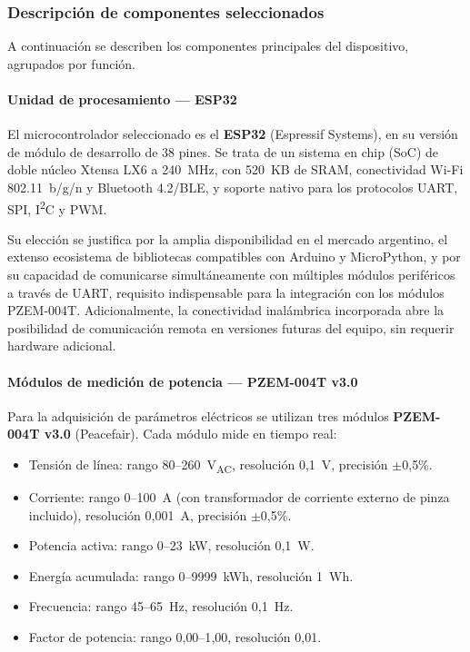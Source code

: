\subsubsection{Descripción de componentes seleccionados}
\label{subsubsec:componentes}

A continuación se describen los componentes principales del dispositivo,
agrupados por función.

\paragraph{Unidad de procesamiento — ESP32}

El microcontrolador seleccionado es el \textbf{ESP32} (Espressif Systems),
en su versión de módulo de desarrollo de 38 pines.
Se trata de un sistema en chip (SoC) de doble núcleo Xtensa LX6
a 240~MHz, con 520~KB de SRAM, conectividad Wi-Fi 802.11~b/g/n
y Bluetooth 4.2/BLE, y soporte nativo para los protocolos
UART, SPI, I\textsuperscript{2}C y PWM.

Su elección se justifica por la amplia disponibilidad en el mercado
argentino, el extenso ecosistema de bibliotecas compatibles con
Arduino y MicroPython, y por su capacidad de comunicarse simultáneamente
con múltiples módulos periféricos a través de UART, requisito
indispensable para la integración con los módulos PZEM-004T.
Adicionalmente, la conectividad inalámbrica incorporada abre la posibilidad
de comunicación remota en versiones futuras del equipo, sin requerir
hardware adicional.

\paragraph{Módulos de medición de potencia — PZEM-004T v3.0}

Para la adquisición de parámetros eléctricos se utilizan tres módulos
\textbf{PZEM-004T v3.0} (Peacefair).
Cada módulo mide en tiempo real:

\begin{itemize}
    \item Tensión de línea: rango 80--260~V\textsubscript{AC},
          resolución 0{,}1~V, precisión $\pm$0{,}5\%.
    \item Corriente: rango 0--100~A (con transformador de corriente externo
          de pinza incluido), resolución 0{,}001~A, precisión $\pm$0{,}5\%.
    \item Potencia activa: rango 0--23~kW, resolución 0{,}1~W.
    \item Energía acumulada: rango 0--9999~kWh, resolución 1~Wh.
    \item Frecuencia: rango 45--65~Hz, resolución 0{,}1~Hz.
    \item Factor de potencia: rango 0{,}00--1{,}00, resolución 0{,}01.
\end{itemize}


